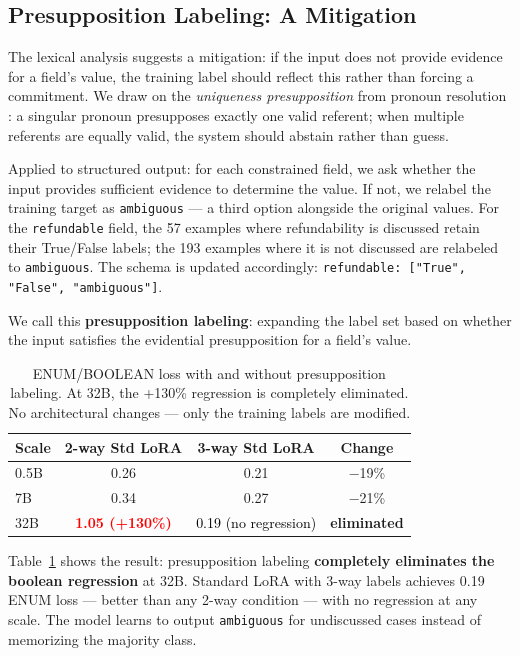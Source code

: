 \documentclass[11pt]{article}
\newcommand{\regress}[1]{\textcolor{red}{\textbf{#1}}}
\newcommand{\improve}[1]{\textcolor{black}{#1}}
\begin{document}
\subsection{Presupposition Labeling: A Mitigation}\label{sec:pcl}

The lexical analysis suggests a mitigation: if the input does not provide evidence for a field's value, the training label should reflect this rather than forcing a commitment. We draw on the \emph{uniqueness presupposition} from pronoun resolution \cite{baldwin1997cogniac}: a singular pronoun presupposes exactly one valid referent; when multiple referents are equally valid, the system should abstain rather than guess.

Applied to structured output: for each constrained field, we ask whether the input provides sufficient evidence to determine the value. If not, we relabel the training target as \texttt{ambiguous} --- a third option alongside the original values. For the \texttt{refundable} field, the 57 examples where refundability is discussed retain their True/False labels; the 193 examples where it is not discussed are relabeled to \texttt{ambiguous}. The schema is updated accordingly: \texttt{refundable: ["True", "False", "ambiguous"]}.

We call this \textbf{presupposition labeling}: expanding the label set based on whether the input satisfies the evidential presupposition for a field's value.

\begin{table}[h]
\centering
\small
\begin{tabular}{lccc}
\toprule
\textbf{Scale} & \textbf{2-way Std LoRA} & \textbf{3-way Std LoRA} & \textbf{Change} \\
\midrule
0.5B & 0.26 & 0.21 & $-$19\% \\
7B   & 0.34 & 0.27 & $-$21\% \\
32B  & \regress{1.05 (+130\%)} & \improve{0.19 (no regression)} & \textbf{eliminated} \\
\bottomrule
\end{tabular}
\caption{ENUM/BOOLEAN loss with and without presupposition labeling. At 32B, the +130\% regression is completely eliminated. No architectural changes --- only the training labels are modified.}
\label{tab:pcl}
\end{table}

Table~\ref{tab:pcl} shows the result: presupposition labeling \textbf{completely eliminates the boolean regression} at 32B. Standard LoRA with 3-way labels achieves 0.19 ENUM loss --- better than any 2-way condition --- with no regression at any scale. The model learns to output \texttt{ambiguous} for undiscussed cases instead of memorizing the majority class.
\end{document}
